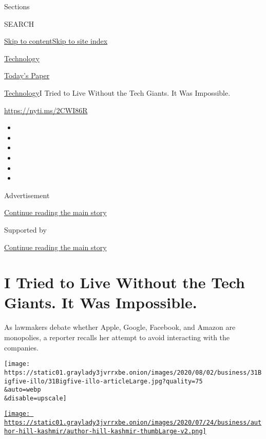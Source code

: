 Sections

SEARCH

\protect\hyperlink{site-content}{Skip to
content}\protect\hyperlink{site-index}{Skip to site index}

\href{https://www.nytimes3xbfgragh.onion/section/technology}{Technology}

\href{https://myaccount.nytimes3xbfgragh.onion/auth/login?response_type=cookie\&client_id=vi}{}

\href{https://www.nytimes3xbfgragh.onion/section/todayspaper}{Today's
Paper}

\href{/section/technology}{Technology}\textbar{}I Tried to Live Without
the Tech Giants. It Was Impossible.

\href{https://nyti.ms/2CWI86R}{https://nyti.ms/2CWI86R}

\begin{itemize}
\item
\item
\item
\item
\item
\item
\end{itemize}

Advertisement

\protect\hyperlink{after-top}{Continue reading the main story}

Supported by

\protect\hyperlink{after-sponsor}{Continue reading the main story}

\hypertarget{i-tried-to-live-without-the-tech-giants-it-was-impossible}{%
\section{I Tried to Live Without the Tech Giants. It Was
Impossible.}\label{i-tried-to-live-without-the-tech-giants-it-was-impossible}}

As lawmakers debate whether Apple, Google, Facebook, and Amazon are
monopolies, a reporter recalls her attempt to avoid interacting with the
companies.

\texttt{[image: https://static01.graylady3jvrrxbe.onion/images/2020/08/02/business/31Bigfive-illo/31Bigfive-illo-articleLarge.jpg?quality=75\\\&auto=webp\\\&disable=upscale]}

\href{https://www.nytimes3xbfgragh.onion/by/kashmir-hill}{\texttt{[image: https://static01.graylady3jvrrxbe.onion/images/2020/07/24/business/author-hill-kashmir/author-hill-kashmir-thumbLarge-v2.png]}}

